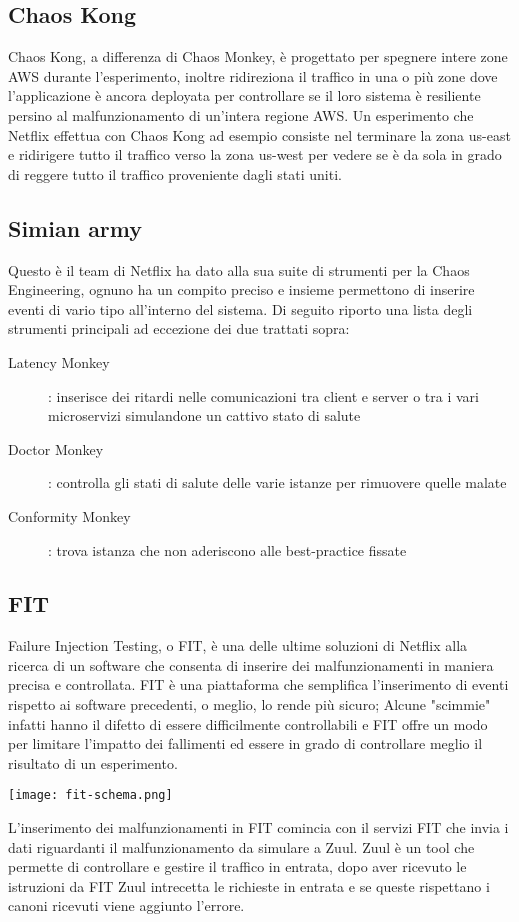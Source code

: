 \subsection{Chaos Kong}
Chaos Kong, a differenza di Chaos Monkey, è progettato per spegnere intere zone AWS durante l'esperimento, inoltre ridireziona il traffico in una o più zone dove l'applicazione è ancora deployata per controllare se il loro sistema è resiliente persino al malfunzionamento di un'intera regione AWS.
Un esperimento che Netflix effettua con Chaos Kong ad esempio consiste nel terminare la zona us-east e ridirigere tutto il traffico verso la zona us-west per vedere se è da sola in grado di reggere tutto il traffico proveniente dagli stati uniti.

\subsection{Simian army}
Questo è il team di Netflix ha dato alla sua suite di strumenti per la Chaos Engineering, ognuno ha un compito preciso e insieme permettono di inserire eventi di vario tipo all'interno del sistema.
Di seguito riporto una lista degli strumenti principali ad eccezione dei due trattati sopra:
\begin{description}
    \item[Latency Monkey]: inserisce dei ritardi nelle comunicazioni tra client e server o tra i vari microservizi simulandone un cattivo stato di salute
    \item[Doctor Monkey]: controlla gli stati di salute delle varie istanze per rimuovere quelle malate
    \item[Conformity Monkey]: trova istanza che non aderiscono alle best-practice fissate
\end{description}

\subsection{FIT}
Failure Injection Testing, o FIT, è una delle ultime soluzioni di Netflix alla ricerca di un software che consenta di inserire dei malfunzionamenti in maniera precisa e controllata.
FIT è una piattaforma che semplifica l'inserimento di eventi rispetto ai software precedenti, o meglio, lo rende più sicuro; Alcune "scimmie" infatti hanno il difetto di essere difficilmente controllabili e FIT offre un modo per limitare l'impatto dei fallimenti ed essere in grado di controllare meglio il risultato di un esperimento.
\begin{center}
    \centering
    \texttt{[image: fit-schema.png]}
    \label{tab:fitschema}
\end{center}
L'inserimento dei malfunzionamenti in FIT comincia con il servizi FIT che invia i dati riguardanti il malfunzionamento da simulare a Zuul.
Zuul è un tool che permette di controllare e gestire il traffico in entrata, dopo aver ricevuto le istruzioni da FIT Zuul intrecetta le richieste in entrata e se queste rispettano i canoni ricevuti viene aggiunto l'errore.

